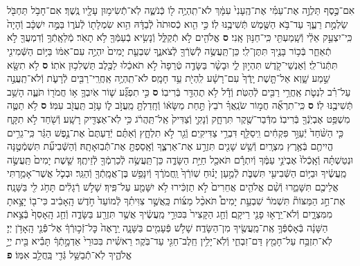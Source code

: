 \documentclass[twoside, openany, parskip=half, 11pt]{book}
\begin{document}
\begin{footnotesize}
\begin{multicols}{2}
\\
\\
אִם־כֶּ֣סֶף תַּלְוֶ֣ה אֶת־עַמִּ֗י אֶת־הֶֽעָנִי֙ עִמָּ֔ךְ לֹא־תִֽהְיֶ֥ה ל֖וֹ כְּֿנֹשֶׁ֑ה לֹֽא־תְֿֿשִׂימ֥וּן עָלָ֖יו נֶֽשֶׁךְ׃ אִם־חָבֹ֥ל תַּחְבֹּ֖ל שַׂלְמַ֣ת רֵעֶ֑ךָ עַד־בֹּ֥א הַשֶּׁ֖מֶשׁ תְּֿשִׁיבֶ֥נּוּ לֽוֹ׃ כִּ֣י הִ֤וא כְֿסוּתֹה֙ לְֿבַדָּ֔הּ הִ֥וא שִׂמְלָת֖וֹ לְֿעֹר֑וֹ בַּמֶּ֣ה יִשְׁכָּ֔ב וְֿהָיָה֙ כִּֽי־יִצְעַ֣ק אֵלַ֔י וְֿשָֽׁמַעְתִּ֖י כִּֽי־חַנּ֥וּן אָֽנִי׃ \textbf{ס}
אֱלֹהִ֖ים לֹ֣א תְֿקַלֵּ֑ל וְֿנָשִׂ֥יא בְֿעַמְּֿךָ֖ לֹ֥א תָאֹֽר׃ מְֿלֵאָֽתְֿךָ֥ וְֿדִמְעֲךָ֖ לֹ֣א תְֿאַחֵ֑ר בְּֿכ֥וֹר בָּנֶ֖יךָ תִּתֶּן־לִֽי׃ כֵּן־תַּֽעֲשֶׂ֥ה לְֿשֹֽׁרְֿךָ֖ לְֿצֹאנֶ֑ךָ שִׁבְעַ֤ת יָמִים֙ יִהְיֶ֣ה עִם־אִמּ֔וֹ בַּיּ֥וֹם הַשְּֿׁמִינִ֖י תִּתְּֿנוֹ־לִֽי׃ וְֿאַנְשֵׁי־קֹ֖דֶשׁ תִּהְי֣וּן לִ֑י וּבָשָׂ֨ר בַּשָּׂדֶ֤ה טְֿרֵפָה֙ לֹ֣א תֹאכֵ֔לוּ לַכֶּ֖לֶב תַּשְׁלִכ֥וּן אֹתֽוֹ׃ \textbf{ס} לֹ֥א תִשָּׂ֖א שֵׁ֣מַע שָׁ֑וְא אַל־תָּ֤שֶׁת יָֽדְֿךָ֙ עִם־רָשָׁ֔ע לִֽהְיֹ֖ת עֵ֥ד חָמָֽס׃ לֹא־תִֽהְיֶ֥ה אַֽחֲרֵֽי־רַבִּ֖ים לְֿרָעֹ֑ת וְֿלֹא־תַֽעֲנֶ֣ה עַל־רִ֗ב לִנְטֹ֛ת אַֽחֲרֵ֥י רַבִּ֖ים לְֿהַטֹּֽת׃ וְֿדָ֕ל לֹ֥א תֶהְדַּ֖ר בְּֿרִיבֽוֹ׃ \textbf{ס} כִּ֣י תִפְגַּ֞ע שׁ֧וֹר אֹֽיִבְךָ֛ א֥וֹ חֲמֹר֖וֹ תֹּעֶ֑ה הָשֵׁ֥ב תְּֿשִׁיבֶ֖נּוּ לֽוֹ׃ \textbf{ס} כִּֽי־תִרְאֶ֞ה חֲמ֣וֹר שֹׂנַֽאֲךָ֗ רֹבֵץ֙ תַּ֣חַת מַשָּׂא֔וֹ וְֿחָֽדַלְתָּ֖ מֵֽעֲזֹ֣ב ל֑וֹ עָזֹ֥ב תַּֽעֲזֹ֖ב עִמּֽוֹ׃ \textbf{ס}
לֹ֥א תַטֶּ֛ה מִשְׁפַּ֥ט אֶבְיֹֽנְֿךָ֖ בְּֿרִיבֽוֹ׃ מִדְּֿבַר־שֶׁ֖קֶר תִּרְחָ֑ק וְֿנָקִ֤י וְֿצַדִּיק֙ אַֽל־תַּֽהֲרֹ֔ג כִּ֥י לֹֽא־אַצְדִּ֖יק רָשָֽׁע׃ וְֿשֹׁ֖חַד לֹ֣א תִקָּ֑ח כִּ֤י הַשֹּׁ֨חַד֙ יְֿעַוֵּ֣ר פִּקְחִ֔ים וִֽיסַלֵּ֖ף דִּבְרֵ֥י צַדִּיקִֽים׃ וְֿגֵ֖ר לֹ֣א תִלְחָ֑ץ וְֿאַתֶּ֗ם יְֿדַעְתֶּם֙ אֶת־נֶ֣פֶשׁ הַגֵּ֔ר כִּֽי־גֵרִ֥ים הֱיִיתֶ֖ם בְּֿאֶ֥רֶץ מִצְרָֽיִם׃ וְֿשֵׁ֥שׁ שָׁנִ֖ים תִּזְרַ֣ע אֶת־אַרְצֶ֑ךָ וְֿאָֽסַפְתָּ֖ אֶת־תְּֿֿבֽוּאָתָֽהּ׃ וְֿהַשְּֿׁבִיעִ֞ת תִּשְׁמְֿטֶ֣נָּה וּנְטַשְׁתָּ֗הּ וְֿאָֽכְֿלוּ֙ אֶבְיֹנֵ֣י עַמֶּ֔ךָ וְֿיִתְרָ֕ם תֹּאכַ֖ל חַיַּ֣ת הַשָּׂדֶ֑ה כֵּן־תַּֽעֲשֶׂ֥ה לְֿכַרְמְֿךָ֖ לְֿזֵיתֶֽךָ׃ שֵׁ֤שֶׁת יָמִים֙ תַּֽעֲשֶׂ֣ה מַֽעֲשֶׂ֔יךָ וּבַיּ֥וֹם הַשְּֿׁבִיעִ֖י תִּשְׁבֹּ֑ת לְֿמַ֣עַן יָנ֗וּחַ שֽׁוֹרְֿךָ֙ וַֽחֲמֹרֶ֔ךָ וְֿיִנָּפֵ֥שׁ בֶּן־אֲמָֽתְֿךָ֖ וְֿהַגֵּֽר׃ וּבְכֹ֛ל אֲשֶׁר־אָמַ֥רְתִּי אֲלֵיכֶ֖ם תִּשָּׁמֵ֑רוּ וְֿשֵׁ֨ם אֱלֹהִ֤ים אֲחֵרִים֙ לֹ֣א תַזְכִּ֔ירוּ לֹ֥א יִשָּׁמַ֖ע עַל־פִּֽיךָ׃ שָׁלֹ֣שׁ רְֿגָלִ֔ים תָּחֹ֥ג לִ֖י בַּשָּׁנָֽה׃ אֶת־חַ֣ג הַמַּצּוֹת֘ תִּשְׁמֹר֒ שִׁבְעַ֣ת יָמִים֩ תֹּאכַ֨ל מַצּ֜וֹת כַּֽאֲשֶׁ֣ר צִוִּיתִ֗ךָ לְֿמוֹעֵד֙ חֹ֣דֶשׁ הָֽאָבִ֔יב כִּי־ב֖וֹ יָצָ֣אתָ מִמִּצְרָ֑יִם וְֿלֹא־יֵֽרָא֥וּ פָנַ֖י רֵיקָֽם׃ וְֿחַ֤ג הַקָּצִיר֙ בִּכּוּרֵ֣י מַֽעֲשֶׂ֔יךָ אֲשֶׁ֥ר תִּזְרַ֖ע בַּשָּׂדֶ֑ה וְֿחַ֤ג הָֽאָסִף֙ בְּֿצֵ֣את הַשָּׁנָ֔ה בְּֿאָסְֿפְּֿךָ֥ אֶֽת־מַֽעֲשֶׂ֖יךָ מִן־הַשָּׂדֶֽה׃ שָׁלֹ֥שׁ פְּֿעָמִ֖ים בַּשָּׁנָ֑ה יֵֽרָאֶה֙ כׇּל־זְֿכ֣וּרְֿךָ֔ אֶל־פְּֿֿנֵ֖י הָֽאָדֹ֥ן יְיָ׃ לֹֽא־תִזְבַּ֥ח עַל־חָמֵ֖ץ דַּם־זִבְחִ֑י וְֿלֹֽא־יָלִ֥ין חֵֽלֶב־חַגִּ֖י עַד־בֹּֽקֶר׃ רֵאשִׁ֗ית בִּכּוּרֵי֙ אַדְמָ֣תְֿךָ֔ תָּבִ֕יא בֵּ֖ית יְיָ֣ אֱלֹהֶ֑יךָ לֹֽא־תְֿֿבַשֵּׁ֥ל גְּֿדִ֖י בַּֽחֲלֵ֥ב אִמּֽוֹ׃ \textbf{פ}


\end{multicols}
\end{footnotesize}
\end{document}
